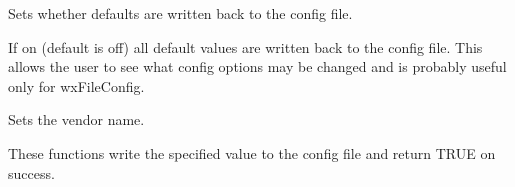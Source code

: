 Sets whether defaults are written back to the config file.

If on (default is off) all default values are written back to the config file.
This allows the user to see what config options may be changed and is probably
useful only for wxFileConfig.

\label{wxconfigbasesetvendorname}


Sets the vendor name.

\label{wxconfigbasewrite}





These functions write the specified value to the config file and return TRUE
on success.


